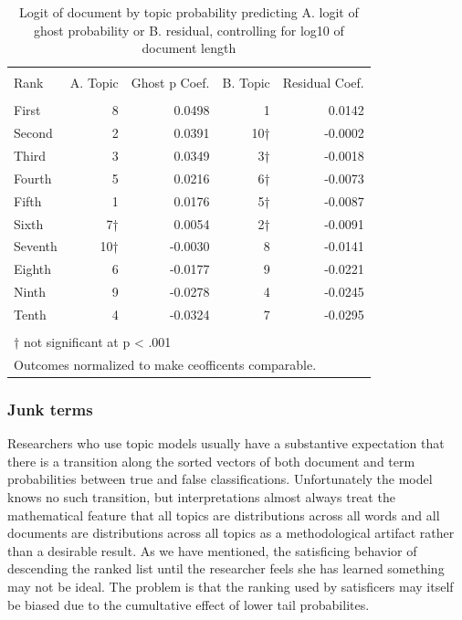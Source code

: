 \documentclass[]{book}
\theoremstyle{definition}
\theoremstyle{definition}
\theoremstyle{definition}
\theoremstyle{remark}
\begin{document}
\begin{table}[!htbp] \centering 
  \caption{Logit of document by topic probability predicting A. logit of ghost probability or B. residual, controlling for log10 of document length} 
  \label{tab:Kghost} 
\begin{tabular}{@{\extracolsep{5pt}} lrrrr} 
\\[-1.8ex]\hline 
\hline \\[-1.8ex] 
Rank & A. Topic & Ghost p Coef. & B. Topic & Residual Coef. \\ 
\hline \\[-1.8ex] 
First & 8 &  0.0498 & 1 &  0.0142 \\ 
Second & 2 &  0.0391 & 10† & -0.0002 \\ 
Third & 3 &  0.0349 & 3† & -0.0018 \\ 
Fourth & 5 &  0.0216 & 6† & -0.0073 \\ 
Fifth & 1 &  0.0176 & 5† & -0.0087 \\ 
Sixth & 7† &  0.0054 & 2† & -0.0091 \\ 
Seventh & 10† & -0.0030 & 8 & -0.0141 \\ 
Eighth & 6 & -0.0177 & 9 & -0.0221 \\ 
Ninth & 9 & -0.0278 & 4 & -0.0245 \\ 
Tenth & 4 & -0.0324 & 7 & -0.0295 \\ 
\hline \\[-1.8ex] 
\multicolumn{5}{l}{† not significant at p < .001} \\ 
\multicolumn{5}{l}{Outcomes normalized to make ceofficents comparable.} \\ 
\end{tabular} 
\end{table}

\hypertarget{junk-terms}{%
\subsubsection{Junk terms}\label{junk-terms}}

Researchers who use topic models usually have a substantive expectation
that there is a transition along the sorted vectors of both document and
term probabilities between true and false classifications. Unfortunately
the model knows no such transition, but interpretations almost always
treat the mathematical feature that all topics are distributions across
all words and all documents are distributions across all topics as a
methodological artifact rather than a desirable result. As we have
mentioned, the satisficing behavior of descending the ranked list until
the researcher feels she has learned something may not be ideal. The
problem is that the ranking used by satisficers may itself be biased due
to the cumultative effect of lower tail probabilites.
\end{document}
